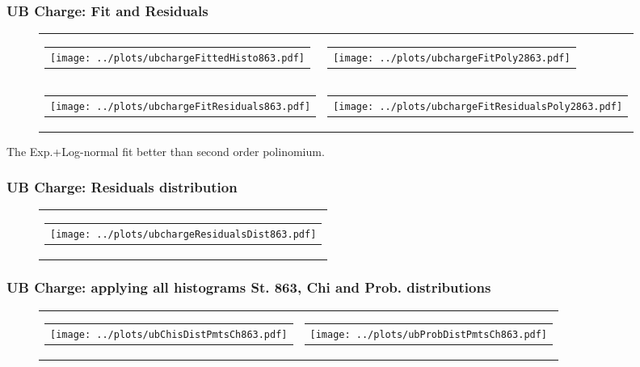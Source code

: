 \documentclass[aspectratio=169]{beamer}
\begin{document}
\begin{frame}
  \frametitle{UB Charge: Fit and Residuals}
  \begin{figure}
    \centering
    \begin{tabularx}{\textwidth}{CC}
      \begin{tabular}{l}
        \texttt{[image: ../plots/ubchargeFittedHisto863.pdf]}
      \end{tabular}
      &
      \begin{tabular}{l}
        \texttt{[image: ../plots/ubchargeFitPoly2863.pdf]}
      \end{tabular}
      \\
      \begin{tabular}{l}
        \texttt{[image: ../plots/ubchargeFitResiduals863.pdf]}
      \end{tabular}
      &
      \begin{tabular}{l}
        \texttt{[image: ../plots/ubchargeFitResidualsPoly2863.pdf]}
      \end{tabular}
    \end{tabularx}
  \end{figure}
  The Exp.+Log-normal fit better than second order polinomium.
\end{frame}


\begin{frame}
  \frametitle{UB Charge: Residuals distribution}
  \begin{figure}
    \centering
    \begin{tabularx}{\textwidth}{C}
      \begin{tabular}{l}
        \texttt{[image: ../plots/ubchargeResidualsDist863.pdf]}
      \end{tabular}
    \end{tabularx}
  \end{figure}
\end{frame}


\begin{frame}
  \frametitle{UB Charge: applying all histograms St. 863, Chi and Prob. distributions}
  \begin{figure}
    \centering
    \begin{tabularx}{\textwidth}{CC}
      \begin{tabular}{l}
        \texttt{[image: ../plots/ubChisDistPmtsCh863.pdf]}
      \end{tabular}
      &
      \begin{tabular}{l}
        \texttt{[image: ../plots/ubProbDistPmtsCh863.pdf]}
      \end{tabular}
    \end{tabularx}
  \end{figure}
\end{frame}
\end{document}
